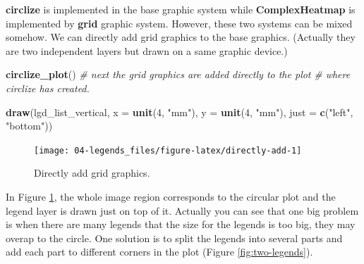 \documentclass[]{book}
\newenvironment{Shaded}{\begin{snugshade}}{\end{snugshade}}
\newcommand{\KeywordTok}[1]{\textcolor[rgb]{0.13,0.29,0.53}{\textbf{#1}}}
\newcommand{\DataTypeTok}[1]{\textcolor[rgb]{0.13,0.29,0.53}{#1}}
\newcommand{\DecValTok}[1]{\textcolor[rgb]{0.00,0.00,0.81}{#1}}
\newcommand{\StringTok}[1]{\textcolor[rgb]{0.31,0.60,0.02}{#1}}
\newcommand{\CommentTok}[1]{\textcolor[rgb]{0.56,0.35,0.01}{\textit{#1}}}
\newcommand{\NormalTok}[1]{#1}
\begin{document}
\textbf{circlize} is implemented in the base graphic system while
\textbf{ComplexHeatmap} is implemented by \textbf{grid} graphic system.
However, these two systems can be mixed somehow. We can directly add
grid graphics to the base graphics. (Actually they are two independent
layers but drawn on a same graphic device.)

\begin{Shaded}
\begin{Highlighting}[]
\KeywordTok{circlize_plot}\NormalTok{()}
\CommentTok{# next the grid graphics are added directly to the plot}
\CommentTok{# where circlize has created.}

\KeywordTok{draw}\NormalTok{(lgd_list_vertical, }\DataTypeTok{x =} \KeywordTok{unit}\NormalTok{(}\DecValTok{4}\NormalTok{, }\StringTok{"mm"}\NormalTok{), }\DataTypeTok{y =} \KeywordTok{unit}\NormalTok{(}\DecValTok{4}\NormalTok{, }\StringTok{"mm"}\NormalTok{), }\DataTypeTok{just =} \KeywordTok{c}\NormalTok{(}\StringTok{"left"}\NormalTok{, }\StringTok{"bottom"}\NormalTok{))}
\end{Highlighting}
\end{Shaded}

\begin{figure}

{\centering \texttt{[image: 04-legends\_files/figure-latex/directly-add-1]} 

}

\caption{Directly add grid graphics.}\label{fig:directly-add}
\end{figure}

In Figure \ref{fig:directly-add}, the whole image region corresponds to
the circular plot and the legend layer is drawn just on top of it.
Actually you can see that one big problem is when there are many legends
that the size for the legends is too big, they may overap to the circle.
One solution is to split the legends into several parts and add each
part to different corners in the plot (Figure \ref{fig:two-legends}).
\end{document}
